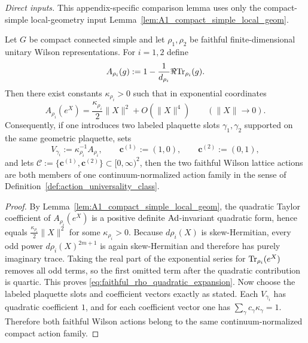 \noindent\emph{Direct inputs.} This appendix-specific comparison lemma uses only the compact-simple local-geometry input Lemma~\ref{lem:A1_compact_simple_local_geom}.\par

\begin{lemma}
\label{lem:faithful_Wilson_action_class}
Let $G$ be compact connected simple and let $\rho_1,\rho_2$ be faithful finite-dimensional unitary Wilson representations.
For $i=1,2$ define
\[
A_{\rho_i}(g):=1-\frac{1}{d_{\rho_i}}\Re\mathrm{Tr}_{\rho_i}(g).
\]
Then there exist constants $\kappa_{\rho_i}>0$ such that in exponential coordinates
\begin{equation}\label{eq:faithful_rho_quadratic_expansion}
A_{\rho_i}(e^X)=\frac{\kappa_{\rho_i}}{2}\|X\|^2+O(\|X\|^4)
\qquad (\|X\|\to 0).
\end{equation}
Consequently, if one introduces two labeled plaquette slots $\gamma_1,\gamma_2$ supported on the same geometric plaquette, sets
\[
V_{\gamma_i}:=\kappa_{\rho_i}^{-1}A_{\rho_i},
\qquad
\mathbf c^{(1)}:=(1,0),
\qquad
\mathbf c^{(2)}:=(0,1),
\]
and lets $\mathcal C:=\{\mathbf c^{(1)},\mathbf c^{(2)}\}\subset [0,\infty)^2$, then the two faithful Wilson lattice actions are both members of one continuum-normalized action family in the sense of Definition~\ref{def:action_universality_class}.
\end{lemma}

\begin{proof}
By Lemma~\ref{lem:A1_compact_simple_local_geom}, the quadratic Taylor coefficient of $A_{\rho_i}(e^X)$ is a positive definite $\operatorname{Ad}$-invariant quadratic form, hence equals $\frac{\kappa_{\rho_i}}{2}\|X\|^2$ for some $\kappa_{\rho_i}>0$.
Because $d\rho_i(X)$ is skew-Hermitian, every odd power $d\rho_i(X)^{2m+1}$ is again skew-Hermitian and therefore has purely imaginary trace.
Taking the real part of the exponential series for $\mathrm{Tr}_{\rho_i}(e^X)$ removes all odd terms, so the first omitted term after the quadratic contribution is quartic.
This proves \eqref{eq:faithful_rho_quadratic_expansion}.
Now choose the labeled plaquette slots and coefficient vectors exactly as stated.
Each $V_{\gamma_i}$ has quadratic coefficient $1$, and for each coefficient vector one has $\sum_{\gamma}c_\gamma\kappa_\gamma=1$.
Therefore both faithful Wilson actions belong to the same continuum-normalized compact action family.
\end{proof}

